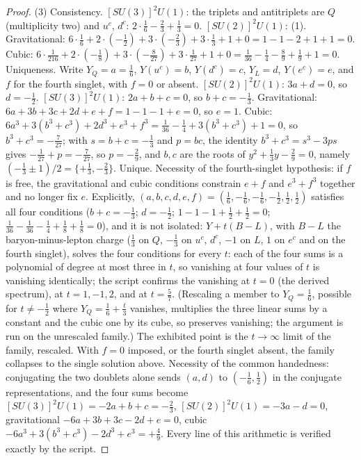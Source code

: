 \documentclass[11pt]{article}
\theoremstyle{definition}
\begin{document}
\begin{proof}
(3) Consistency. $[SU(3)]^{2}U(1)$: the triplets and antitriplets are $Q$ (multiplicity two) and $u^{c}$, $d^{c}$: $2 \cdot \tfrac16 - \tfrac23 + \tfrac13 = 0$. $[SU(2)]^{2}U(1)$: (1). Gravitational: $6 \cdot \tfrac16 + 2 \cdot (-\tfrac12) + 3 \cdot (-\tfrac23) + 3 \cdot \tfrac13 + 1 + 0 = 1 - 1 - 2 + 1 + 1 = 0$. Cubic: $6 \cdot \tfrac{1}{216} + 2 \cdot (-\tfrac18) + 3 \cdot (-\tfrac{8}{27}) + 3 \cdot \tfrac{1}{27} + 1 + 0 = \tfrac{1}{36} - \tfrac14 - \tfrac89 + \tfrac19 + 1 = 0$. Uniqueness. Write $Y_{Q} = a = \tfrac16$, $Y(u^{c}) = b$, $Y(d^{c}) = c$, $Y_{L} = d$, $Y(e^{c}) = e$, and $f$ for the fourth singlet, with $f = 0$ or absent. $[SU(2)]^{2}U(1)$: $3a + d = 0$, so $d = -\tfrac12$. $[SU(3)]^{2}U(1)$: $2a + b + c = 0$, so $b + c = -\tfrac13$. Gravitational: $6a + 3b + 3c + 2d + e + f = 1 - 1 - 1 + e = 0$, so $e = 1$. Cubic: $6a^{3} + 3(b^{3} + c^{3}) + 2d^{3} + e^{3} + f^{3} = \tfrac{1}{36} - \tfrac14 + 3(b^{3} + c^{3}) + 1 = 0$, so $b^{3} + c^{3} = -\tfrac{7}{27}$; with $s = b + c = -\tfrac13$ and $p = bc$, the identity $b^{3} + c^{3} = s^{3} - 3ps$ gives $-\tfrac{1}{27} + p = -\tfrac{7}{27}$, so $p = -\tfrac29$, and $b, c$ are the roots of $y^{2} + \tfrac13 y - \tfrac29 = 0$, namely $(-\tfrac13 \pm 1)/2 = \{+\tfrac13, -\tfrac23\}$. Unique. Necessity of the fourth-singlet hypothesis: if $f$ is free, the gravitational and cubic conditions constrain $e + f$ and $e^{3} + f^{3}$ together and no longer fix $e$. Explicitly, $(a, b, c, d, e, f) = (\tfrac16, -\tfrac16, -\tfrac16, -\tfrac12, \tfrac12, \tfrac12)$ satisfies all four conditions ($b + c = -\tfrac13$; $d = -\tfrac12$; $1 - 1 - 1 + \tfrac12 + \tfrac12 = 0$; $\tfrac{1}{36} - \tfrac{1}{36} - \tfrac14 + \tfrac18 + \tfrac18 = 0$), and it is not isolated: $Y + t(B - L)$, with $B - L$ the baryon-minus-lepton charge ($\tfrac13$ on $Q$, $-\tfrac13$ on $u^{c}$, $d^{c}$, $-1$ on $L$, $1$ on $e^{c}$ and on the fourth singlet), solves the four conditions for every $t$: each of the four sums is a polynomial of degree at most three in $t$, so vanishing at four values of $t$ is vanishing identically; the script confirms the vanishing at $t = 0$ (the derived spectrum), at $t = 1, -1, 2$, and at $t = \tfrac57$. (Rescaling a member to $Y_{Q} = \tfrac16$, possible for $t \neq -\tfrac12$ where $Y_{Q} = \tfrac16 + \tfrac{t}{3}$ vanishes, multiplies the three linear sums by a constant and the cubic one by its cube, so preserves vanishing; the argument is run on the unrescaled family.) The exhibited point is the $t \to \infty$ limit of the family, rescaled. With $f = 0$ imposed, or the fourth singlet absent, the family collapses to the single solution above. Necessity of the common handedness: conjugating the two doublets alone sends $(a, d)$ to $(-\tfrac16, \tfrac12)$ in the conjugate representations, and the four sums become $[SU(3)]^{2}U(1) = -2a + b + c = -\tfrac23$, $[SU(2)]^{2}U(1) = -3a - d = 0$, gravitational $-6a + 3b + 3c - 2d + e = 0$, cubic $-6a^{3} + 3(b^{3} + c^{3}) - 2d^{3} + e^{3} = +\tfrac49$. Every line of this arithmetic is verified exactly by the script.
\end{proof}
\end{document}
